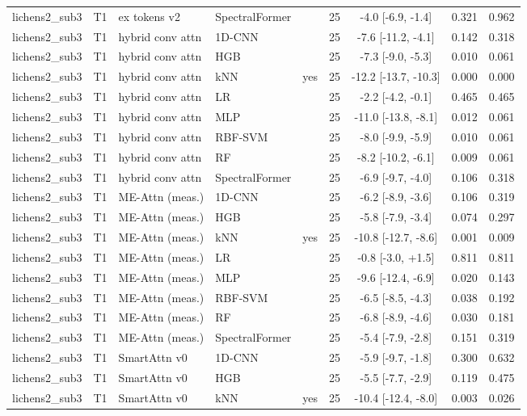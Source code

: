 \begin{tabular}{lllllcccc}
lichens2_sub3 & T1 & ex tokens v2 & SpectralFormer &  & 25 & -4.0 [-6.9, -1.4] & 0.321 & 0.962 \\
lichens2_sub3 & T1 & hybrid conv attn & 1D-CNN &  & 25 & -7.6 [-11.2, -4.1] & 0.142 & 0.318 \\
lichens2_sub3 & T1 & hybrid conv attn & HGB &  & 25 & -7.3 [-9.0, -5.3] & 0.010 & 0.061 \\
lichens2_sub3 & T1 & hybrid conv attn & kNN & yes & 25 & -12.2 [-13.7, -10.3] & 0.000 & 0.000 \\
lichens2_sub3 & T1 & hybrid conv attn & LR &  & 25 & -2.2 [-4.2, -0.1] & 0.465 & 0.465 \\
lichens2_sub3 & T1 & hybrid conv attn & MLP &  & 25 & -11.0 [-13.8, -8.1] & 0.012 & 0.061 \\
lichens2_sub3 & T1 & hybrid conv attn & RBF-SVM &  & 25 & -8.0 [-9.9, -5.9] & 0.010 & 0.061 \\
lichens2_sub3 & T1 & hybrid conv attn & RF &  & 25 & -8.2 [-10.2, -6.1] & 0.009 & 0.061 \\
lichens2_sub3 & T1 & hybrid conv attn & SpectralFormer &  & 25 & -6.9 [-9.7, -4.0] & 0.106 & 0.318 \\
lichens2_sub3 & T1 & ME-Attn (meas.) & 1D-CNN &  & 25 & -6.2 [-8.9, -3.6] & 0.106 & 0.319 \\
lichens2_sub3 & T1 & ME-Attn (meas.) & HGB &  & 25 & -5.8 [-7.9, -3.4] & 0.074 & 0.297 \\
lichens2_sub3 & T1 & ME-Attn (meas.) & kNN & yes & 25 & -10.8 [-12.7, -8.6] & 0.001 & 0.009 \\
lichens2_sub3 & T1 & ME-Attn (meas.) & LR &  & 25 & -0.8 [-3.0, +1.5] & 0.811 & 0.811 \\
lichens2_sub3 & T1 & ME-Attn (meas.) & MLP &  & 25 & -9.6 [-12.4, -6.9] & 0.020 & 0.143 \\
lichens2_sub3 & T1 & ME-Attn (meas.) & RBF-SVM &  & 25 & -6.5 [-8.5, -4.3] & 0.038 & 0.192 \\
lichens2_sub3 & T1 & ME-Attn (meas.) & RF &  & 25 & -6.8 [-8.9, -4.6] & 0.030 & 0.181 \\
lichens2_sub3 & T1 & ME-Attn (meas.) & SpectralFormer &  & 25 & -5.4 [-7.9, -2.8] & 0.151 & 0.319 \\
lichens2_sub3 & T1 & SmartAttn v0 & 1D-CNN &  & 25 & -5.9 [-9.7, -1.8] & 0.300 & 0.632 \\
lichens2_sub3 & T1 & SmartAttn v0 & HGB &  & 25 & -5.5 [-7.7, -2.9] & 0.119 & 0.475 \\
lichens2_sub3 & T1 & SmartAttn v0 & kNN & yes & 25 & -10.4 [-12.4, -8.0] & 0.003 & 0.026 \\

\end{tabular}
